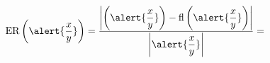 \begin{frame}
\begin{solution}
\begin{enumerate}[d)]
\begin{itemize}
				            \begin{math}
					            \operatorname{ER}
					            \left(\alert{\dfrac{x}{y}}\right)=
					            \dfrac{
						            \left|
						            \left(\alert{\dfrac{x}{y}}\right)-
						            \operatorname{fl}
						            \left(\alert{\dfrac{x}{y}}\right)
						            \right|
					            }{
						            \left|
						            \alert{\dfrac{x}{y}}
						            \right|
					            }=
				            \end{math}
			      \end{itemize}
		\end{enumerate}
	\end{solution}
\end{frame}
